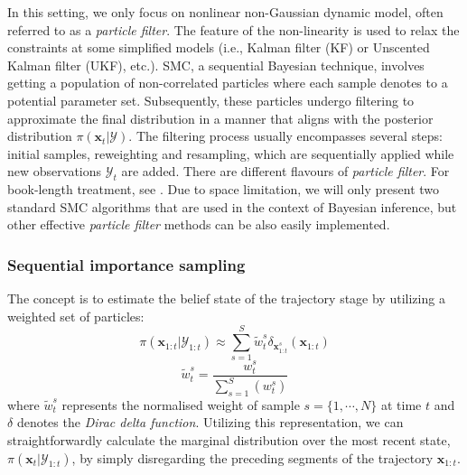 In this setting, we only focus on nonlinear non-Gaussian dynamic model, often referred to as a \textit{particle filter}. The feature of the non-linearity is used to relax the constraints at some simplified models (i.e., Kalman filter (KF) or Unscented Kalman filter (UKF), etc.). \acrshort{SMC}, a sequential Bayesian technique, involves getting a population of non-correlated particles where each sample denotes to a potential parameter set. Subsequently, these particles undergo filtering to approximate the final distribution in a manner that aligns with the posterior distribution $\pi(\boldsymbol{x}_{t}|\mathcal{Y})$. The filtering process usually encompasses several steps: initial samples, reweighting and resampling, which are sequentially applied while new observations $\mathcal{Y}_{t}$ are added. There are different flavours of \textit{particle filter}. For book-length treatment, see \cite{murphy2012}. Due to space limitation, we will only present two standard \acrshort{SMC} algorithms that are used in the context of Bayesian inference, but other effective \textit{particle filter} methods can be also easily implemented.


\subsubsection{Sequential importance sampling}
The concept is to estimate the belief state of the trajectory stage by utilizing a weighted set of particles:
\begin{equation}
    \label{eq: PF-SIS}
\pi(\boldsymbol{x}_{1:t}|\mathcal{Y}_{1:t})
\approx 
\sum_{s=1}^{S} 
\tilde{w}_{t}^{s}
\delta_{\boldsymbol{x}_{1:t}^{s}}(\boldsymbol{x}_{1:t})
\end{equation}
\begin{equation}
    \label{eq: PF-SIS-Normalized_weight}
\tilde{w}_t^s=\frac{w_t^s}{\sum_{s=1}^{S}{(w_t^s)}}
\end{equation}
where $\tilde{w}_{t}^{s}$ represents the normalised weight of sample $s = \{1,\cdots,N\}$ at time $t$ and  $\delta$ denotes the \textit{Dirac delta function}. Utilizing this representation, we can straightforwardly calculate the marginal distribution over the most recent state,$\pi(\boldsymbol{x}_{t}|\mathcal{Y}_{1:t})$, by simply disregarding the preceding segments of the trajectory $\boldsymbol{x}_{1:t}$.

